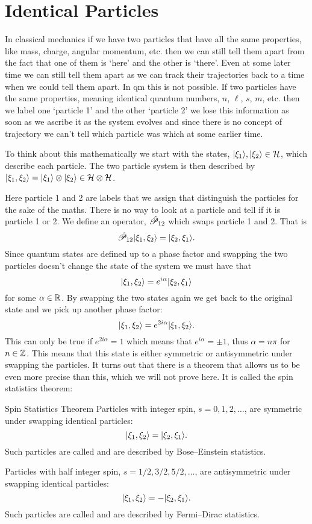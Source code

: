 \section{Identical Particles}
In classical mechanics if we have two particles that have all the same properties, like mass, charge, angular momentum, etc. then we can still tell them apart from the fact that one of them is `here' and the other is `there'.
Even at some later time we can still tell them apart as we can track their trajectories back to a time when we could tell them apart.
In \gls{qm} this is not possible.
If two particles have the same properties, meaning identical quantum numbers, \(n\), \(\ell\), \(s\), \(m\), etc. then we label one `particle 1' and the other `particle 2' we lose this information as soon as we ascribe it as the system evolves and since there is no concept of trajectory we can't tell which particle was which at some earlier time.

To think about this mathematically we start with the states, \(\vert {\xi_1} \rangle, \vert {\xi_2} \rangle\in\mathcal{H}\), which describe each particle.
The two particle system is then described by \(\vert {\xi_1, \xi_2} \rangle = \vert {\xi_1} \rangle\otimes\vert {\xi_2} \rangle \in\mathcal{H} \otimes\mathcal{H}\).

Here particle 1 and 2 are labels that we assign that distinguish the particles for the sake of the maths.
There is no way to look at a particle and tell if it is particle 1 or 2.
We define an operator, \(\hat{\mathscr{P}}_{12}\) which swaps particle 1 and 2.
That is
\[\hat{\mathscr{P}}_{12}\vert {\xi_1, \xi_2} \rangle = \vert {\xi_2, \xi_1} \rangle.\]
Since quantum states are defined up to a phase factor and swapping the two particles doesn't change the state of the system we must have that
\[\vert {\xi_1, \xi_2} \rangle = e^{i\alpha}\vert {\xi_2, \xi_1} \rangle\]
for some \(\alpha\in\mathbb{R}\).
By swapping the two states again we get back to the original state and we pick up another phase factor:
\[\vert {\xi_1, \xi_2} \rangle = e^{2i\alpha}\vert {\xi_1, \xi_2} \rangle.\]
This can only be true if \(e^{2i\alpha} = 1\) which means that \(e^{i\alpha} = \pm 1\), thus \(\alpha = n\pi\) for \(n\in\mathbb{Z}\).
This means that this state is either symmetric or antisymmetric under swapping the particles.
It turns out that there is a theorem that allows us to be even more precise than this, which we will not prove here.
It is called the spin statistics theorem:
\begin{theorem}{Spin Statistics Theorem}{}
    Particles with integer spin, \(s = 0, 1, 2, \dotsc\), are symmetric under swapping identical particles:
    \[\vert {\xi_1, \xi_2} \rangle = \vert {\xi_2, \xi_1} \rangle.\]
    Such particles are called  and are described by Bose--Einstein statistics.
    
    Particles with half integer spin, \(s = 1/2, 3/2, 5/2, \dotsc\), are antisymmetric under swapping identical particles:
    \[\vert {\xi_1, \xi_2} \rangle = - \vert {\xi_2, \xi_1} \rangle.\]
    Such particles are called  and are described by Fermi--Dirac statistics.
\end{theorem}

